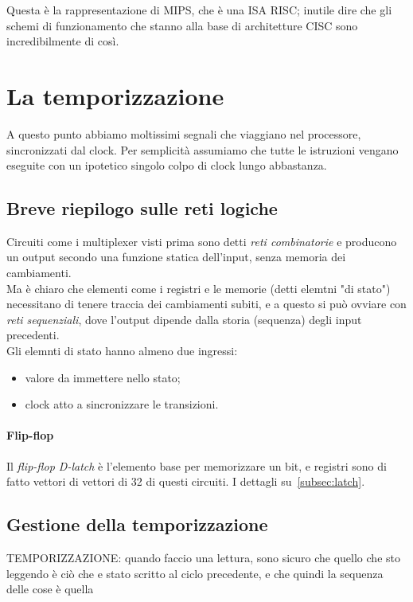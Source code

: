 \documentclass[class=book, crop=false, oneside]{standalone}
\begin{document}
Questa è la rappresentazione di MIPS, che è una ISA RISC; inutile dire che gli schemi di funzionamento che stanno alla base di architetture CISC sono incredibilmente di così.

\section{La temporizzazione}
A questo punto abbiamo moltissimi segnali che viaggiano nel processore, sincronizzati dal clock. Per semplicità assumiamo che tutte le istruzioni vengano eseguite con un ipotetico singolo colpo di clock lungo abbastanza.

\subsection{Breve riepilogo sulle reti logiche}
Circuiti come i multiplexer visti prima sono detti \emph{reti combinatorie} e producono un output secondo una funzione statica dell'input, senza memoria dei cambiamenti.\\
Ma è chiaro che elementi come i registri e le memorie (detti elemtni "di stato") necessitano di tenere traccia dei cambiamenti subiti, e a questo si può ovviare con \emph{reti sequenziali}, dove l'output dipende dalla storia (sequenza) degli input precedenti.\\
Gli elemnti di stato hanno almeno due ingressi:
\begin{itemize}
	\item valore da immettere nello stato;
	\item clock atto a sincronizzare le transizioni.
\end{itemize}

\paragraph{Flip-flop}Il \emph{flip-flop D-latch} è l’elemento base per memorizzare un bit, e registri sono di fatto vettori di vettori di 32 di questi circuiti. I dettagli su~\ref{subsec:latch}.

\subsection{Gestione della temporizzazione}
TEMPORIZZAZIONE: quando faccio una lettura, sono sicuro che quello che sto leggendo è ciò che e stato scritto al ciclo precedente, e che quindi la sequenza delle cose è quella\\
\end{document}

